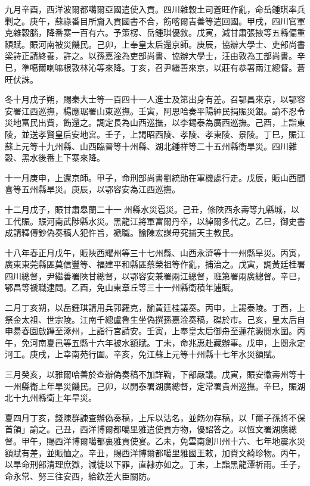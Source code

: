 \begin{pinyinscope}
九月辛酉，西洋波爾都噶爾亞國遣使入貢。四川雜穀土司蒼旺作亂，命岳鍾琪率兵剿之。庚午，蘇祿番目所齎入貢國書不合，飭喀爾吉善等遣回國。甲戌，四川官軍克雜穀腦，降番寨一百有六。予策楞、岳鍾琪優敘。戊寅，減甘肅張掖等五縣偏重額賦。賑河南被災饑民。己卯，上奉皇太后還京師。庚辰，協辦大學士、吏部尚書梁詩正請終養，許之。以孫嘉淦為吏部尚書、協辦大學士，汪由敦為工部尚書。辛巳，準噶爾喇嘛根敦林沁等來降。丁亥，召尹繼善來京，以莊有恭署兩江總督。蒼旺伏誅。

冬十月戊子朔，賜秦大士等一百四十一人進士及第出身有差。召鄂昌來京，以鄂容安署江西巡撫，楊應琚署山東巡撫。壬寅，阿思哈奏平陽紳民捐賑災銀。諭不忍令災地富民出貲，飭還之。調定長為山西巡撫，以李錫泰為廣西巡撫。己酉，上詣東陵，並送孝賢皇后安地宮。壬子，上謁昭西陵、孝陵、孝東陵、景陵。丁巳，賑江蘇上元等十九州縣、山西臨晉等十州縣、湖北鍾祥等二十五州縣衛旱災。四川雜穀、黑水後番上下寨來降。

十一月庚申，上還京師。甲子，命刑部尚書劉統勛在軍機處行走。戊辰，賑山西聞喜等五州縣旱災。庚辰，以鄂容安為江西巡撫。

十二月戊子，賑甘肅皋蘭二十一州縣水災雹災。己丑，修陜西永壽等九縣城，以工代賑。賑河南武陟縣水災。黑龍江將軍富爾丹卒，以綽爾多代之。乙巳，御史書成請釋傳鈔偽奏稿人犯忤旨，褫職。諭陳宏謀毋究捕天主教民。

十八年春正月戊午，賑陜西耀州等三十七州縣、山西永濟等十一州縣旱災。丙寅，廣東東莞縣匪莫信豐等、福建平和縣匪蔡榮祖等作亂，捕治之。戊寅，調黃廷桂署四川總督，尹繼善署陜甘總督，以鄂容安兼署兩江總督，班第署兩廣總督。辛巳，鄂昌等褫職逮問。乙酉，免山東章丘等三十一州縣衛積年逋賦。

二月丁亥朔，以岳鍾琪請用兵郭羅克，諭黃廷桂議奏。丙申，上謁泰陵。丁酉，上祭金太祖、世宗陵。江南千總盧魯生坐偽撰孫嘉淦奏稿，磔於市。己亥，皇太后自申昜春園啟蹕至涿州，上詣行宮請安。壬寅，上奉皇太后御舟至蓮花澱閱水圍。丙午，免河南夏邑等五縣十六年被水額賦。丁未，命兆惠赴藏辦事。戊申，上閱永定河工。庚戌，上幸南苑行圍。辛亥，免江蘇上元等十州縣十七年水災額賦。

三月癸亥，以雅爾哈善於查辦偽奏稿不加詳鞫，下部嚴議。戊寅，賑安徽壽州等十一州縣衛上年旱災饑民。己卯，以開泰署湖廣總督，定常署貴州巡撫。辛巳，賑湖北十九州縣衛上年旱災。

夏四月丁亥，錢陳群諫查辦偽奏稿，上斥以沽名，並飭勿存稿，以「爾子孫將不保首領」諭之。己丑，西洋博爾都噶里雅遣使貢方物，優詔答之。以恆文署湖廣總督。甲午，賜西洋博爾噶都裏雅貢使宴。乙未，免雲南劍川州十六、七年地震水災額賦有差，並賑恤之。辛丑，賜西洋博爾都噶里雅國王敕，加賚文綺珍物。丙午，以旱命刑部清理庶獄，減徒以下罪，直隸亦如之。丁未，上詣黑龍潭祈雨。壬子，命永常、努三往安西，給欽差大臣關防。


\end{pinyinscope}
